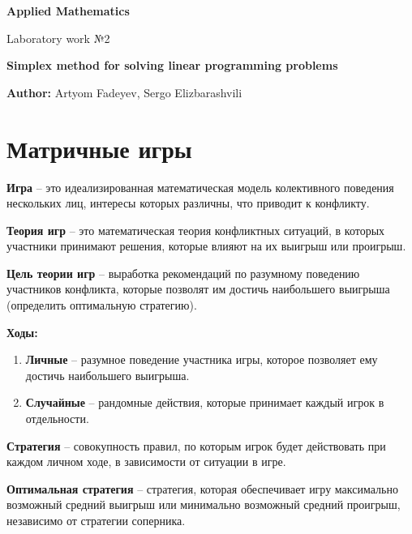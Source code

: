 \documentclass[11pt, a4paper]{article}
\begin{document}
    \begin{titlepage}
        \begin{center}
            \vspace*{2cm}
            \Large
            \textbf{Applied Mathematics}

            \vspace{1cm}
            \large
            Laboratory work №2

            \vspace{1cm}
            \textbf{Simplex method for solving linear programming problems}

            \vspace{1cm}
            \textbf{Author:} Artyom Fadeyev, Sergo Elizbarashvili
        \end{center}
    \end{titlepage}
    \newpage


    \section{Матричные игры}\label{sec:matrix_games}

    \textbf{Игра} -- это идеализированная математическая модель колективного поведения
    нескольких лиц, интересы которых различны, что приводит к конфликту.

    \textbf{Теория игр} -- это математическая теория конфликтных ситуаций, в которых
    участники принимают решения, которые влияют на их выигрыш или проигрыш.

    \textbf{Цель теории игр} -- выработка рекомендаций по разумному поведению участников
    конфликта, которые позволят им достичь наибольшего выигрыша (определить оптимальную стратегию).

    \textbf{Ходы:}
    \begin{enumerate}
        \item \textbf{Личные} -- разумное поведение участника игры, которое позволяет ему достичь наибольшего выигрыша.
        \item \textbf{Случайные} -- рандомные действия, которые принимает каждый игрок в отдельности.
    \end{enumerate}

    \textbf{Стратегия} -- совокупность правил, по которым игрок будет действовать при каждом личном ходе,
    в зависимости от ситуации в игре.

    \textbf{Оптимальная стратегия} -- стратегия, которая обеспечивает игру максимально возможный средний выигрыш или
    минимально возможный средний проигрыш, независимо от стратегии соперника.
\end{document}
